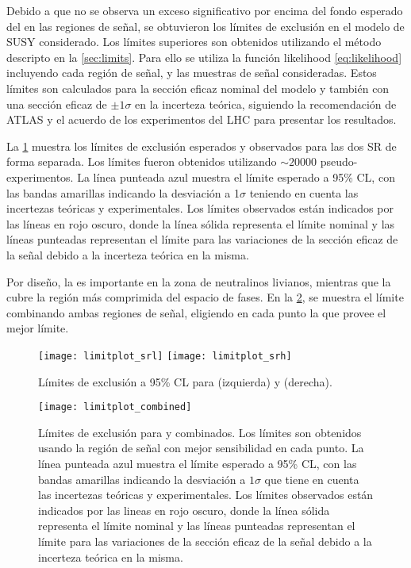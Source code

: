 Debido a que no se observa un exceso significativo por encima del fondo esperado
del {\SM} en las regiones de señal, se obtuvieron los límites de exclusión en el
modelo de SUSY considerado. Los límites superiores son obtenidos utilizando el
método {\cls} descripto en la \cref{sec:limits}. Para ello se utiliza la función
likelihood \cref{eq:likelihood} incluyendo cada región de señal, y las muestras
de señal consideradas.
Estos límites son
calculados para la sección eficaz nominal del modelo y también con una sección
eficaz de $\pm 1 \sigma$ en la incerteza teórica, siguiendo la recomendación de
ATLAS y el acuerdo de los experimentos del LHC para presentar los resultados.

La \cref{fig:limit_srs} muestra los límites de exclusión esperados y
observados para las dos SR de forma separada. Los límites fueron obtenidos
utilizando $\sim 20000$ pseudo-experimentos. La línea punteada azul muestra el
límite esperado a 95\% CL, con las bandas amarillas indicando la desviación a
1$\sigma$ teniendo en cuenta las incertezas teóricas y experimentales. Los
límites observados están indicados por las líneas en rojo oscuro, donde la línea
sólida representa el límite nominal y las líneas punteadas representan el límite
para las variaciones de la sección eficaz de la señal debido a la incerteza
teórica en la misma.

Por diseño, la {\SRL} es importante en la zona de neutralinos livianos, mientras que
la {\SRH} cubre la región más comprimida del espacio de fases. En la
\cref{fig:limit_combined}, se muestra el límite combinando ambas
regiones de señal, eligiendo en cada punto la que provee el mejor límite.


\begin{figure}[!htb]
  \centering

  \texttt{[image: limitplot\_srl]}
  \texttt{[image: limitplot\_srh]}

  \caption{Límites de exclusión a 95\% CL para {\SRL}  (izquierda) y {\SRH} (derecha).}
  \label{fig:limit_srs}
\end{figure}


\begin{figure}[!htb]
  \centering

  \texttt{[image: limitplot\_combined]}

  \caption{Límites de exclusión para {\SRL} y {\SRH} combinados. Los límites
    son obtenidos usando la región de señal con mejor sensibilidad en cada punto.
    La línea punteada azul muestra el límite esperado a 95\% CL, con las bandas
    amarillas indicando la desviación a $1\sigma$ que tiene en cuenta las incertezas
    teóricas y experimentales. Los
    límites observados están indicados por las lineas en rojo oscuro, donde la línea
    sólida representa el límite nominal y las líneas punteadas representan el límite
    para las variaciones de la sección eficaz de la señal debido a la incerteza
    teórica en la misma.}
   \label{fig:limit_combined}

\end{figure}


